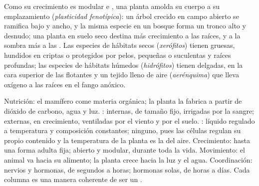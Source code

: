 \begin{proposition}\label{prop:b1:flowering-plant-organization:plasticity}
Como su crecimiento es modular e , una planta amolda su cuerpo a
su emplazamiento (\emph{plasticidad fenotípica}): un árbol crecido en campo abierto se ramifica bajo y ancho, y
la misma especie en un bosque forma un tronco alto y desnudo; una planta en
suelo seco destina más crecimiento a las raíces, y a la sombra más a las
. Las especies de hábitats secos (\emph{xerófitos})
tienen  gruesas,  hundidos en criptas o protegidos por
pelos,  pequeñas o suculentas y raíces profundas; las especies de
hábitats húmedos (\emph{hidrófitos}) tienen 
delgadas,  en la cara superior de las  flotantes y un tejido
lleno de aire (\emph{aerénquima}) que lleva oxígeno a las
raíces en el fango anóxico.
\end{proposition}

\begin{example}\label{ex:b1:flowering-plant-organization:comparison}
Nutrición: el mamífero come materia orgánica; la planta la fabrica a partir
de dióxido de carbono, agua y luz. : internas, de
tamaño fijo, irrigadas por la sangre; externas, en crecimiento, ventiladas
por el viento y por el suelo. : líquido regulado a temperatura
y composición constantes; ninguno, pues las células regulan su propio
contenido y la temperatura de la planta es la del aire. Crecimiento: hasta
una forma adulta fija; abierto y modular, durante toda la vida. Movimiento:
el animal va hacia su alimento; la planta crece hacia la luz y el agua.
Coordinación: nervios y hormonas, de segundos a horas; hormonas solas, de
horas a días. Cada columna es una manera coherente de ser un .
\end{example}


